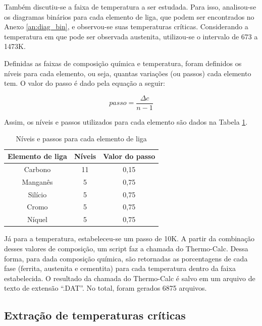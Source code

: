 \documentclass[brazil,tf,epusp]{usp}  %
\begin{document}
Também discutiu-se a faixa de temperatura a ser estudada. Para isso, analisou-se os diagramas binários para cada elemento de liga, que podem ser encontrados no Anexo \ref{an:diag_bin}, e observou-se suas temperaturas críticas. Considerando a temperatura em que pode ser observada austenita, utilizou-se o intervalo de 673 a 1473K.

Definidas as faixas de composição química e temperatura, foram definidos os níveis para cada elemento, ou seja, quantas variações (ou passos) cada elemento tem. O valor do passo é dado pela equação a seguir:

\begin{equation}
  passo = \frac{\Delta c}{n - 1}
\end{equation}

Assim, os níveis e passos utilizados para cada elemento são dados na Tabela \ref{tab:niveis_e_passos}.

\begin{table}
  \caption{Níveis e passos para cada elemento de liga}

  \begin{tabular}{c c c}
  \hline
  \textbf{Elemento de liga} & \textbf{Níveis} & \textbf{Valor do passo} \\
  \hline
  Carbono & 11 & 0,15 \\
  Manganês & 5 & 0,75 \\
  Silício & 5 & 0,75 \\
  Cromo & 5 & 0,75 \\
  Níquel & 5 & 0,75 \\
  \hline
  \end{tabular}

  \label{tab:niveis_e_passos}
\end{table}

Já para a temperatura, estabeleceu-se um passo de 10K. A partir da combinação desses valores de composição, um script faz a chamada do Thermo-Calc\textregistered{}. Dessa forma, para dada composição química, são retornadas as porcentagens de cada fase (ferrita, austenita e cementita) para cada temperatura dentro da faixa estabelecida. O resultado da chamada do Thermo-Calc\textregistered{} é salvo em um arquivo de texto de extensão ``.DAT''. No total, foram gerados 6875 arquivos.

\subsection{Extra\c{c}\~ao de temperaturas cr\'iticas}
\end{document}
